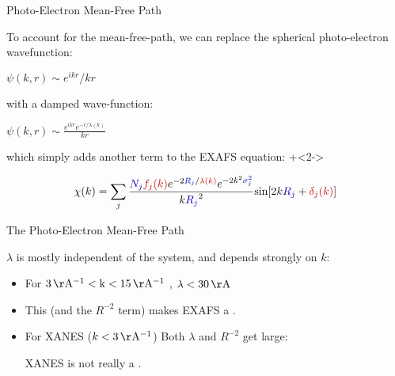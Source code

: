 \begin{slide}{Photo-Electron Mean-Free Path}

  To account for the mean-free-path,  we can
replace the
  spherical photo-electron wavefunction:


  \begin{center}
      \begin{minipage}{40mm}
        {$\displaystyle        \psi(k,r) \sim   {{e^{ikr}}/{kr}}  $}
      \end{minipage}
  \end{center}


\vmm  with a damped wave-function: \vmm

  \begin{center}
      \begin{minipage}{40mm}
        {$\displaystyle \psi(k,r) \sim \frac{e^{ikr} e^{-r/\lambda(k)}}{kr} $ }
      \end{minipage}
  \end{center}

which simply adds another term to the EXAFS equation:
\vmm
  \onslide+<2->

    \[ \chi(k) = \sum_j {\frac{{\Blue{N_j}} {\Red{f_j(k)}}
        e^{-2{\Blue{R_j}}/{\Red{\lambda(k)}}}
        e^{-2k^2{\Blue{\sigma_j^2}}}}{k{\Blue{R_j}}^2}
      {\sin[{2k{\Blue{R_j}} + {\Red{\delta_j(k)}}] }}} \]

  \vfill
\end{slide}

\begin{slide}{The Photo-Electron Mean-Free Path}

  \vspace{-1mm}

  \begin{cenpage}{70mm}    \end{cenpage}

  $\lambda$ is mostly independent of the system, and depends strongly on $k$:

  \begin{itemize}
  \item For $3\rm \,\AA^{-1} <k<15 \rm \,\AA^{-1}$ , $\lambda \rm<
    30\,\AA$
  \item This (and the $R^{-2}$ term) makes EXAFS a {}.
  \item For XANES  ($k < 3\rm\,\AA^{-1}$)    Both $\lambda$ and $R^{-2}$ get
    large:  \par XANES is not really a {}.
  \end{itemize}

\vfill
\end{slide}
